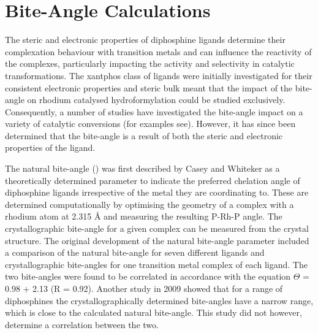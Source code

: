 
\section{Bite-Angle Calculations}
\label{section:biteangle}

The steric and electronic properties of diphosphine ligands determine their complexation behaviour with transition metals and can influence the reactivity of the complexes, particularly impacting the activity and selectivity in catalytic transformations.\cite{Freixa2003, Birkholz2009}  The xantphos class of ligands were initially investigated for their consistent electronic properties and steric bulk meant that the impact of the bite-angle on rhodium catalysed hydroformylation could be studied exclusively.\cite{Kranenburg1995}  Consequently, a number of studies have investigated the bite-angle impact on a variety of catalytic conversions (for examples see\cite{Kranenburg1995b, Haaren2001b, Dudle2011b, Fanjul2013, Birkholz2009}).  However, it has since been determined that the bite-angle is a result of both the steric and electronic properties of the ligand.\cite{Freixa2003}

The natural bite-angle (\natbiteangle) was first described by Casey and Whiteker\cite{Casey1990} as a theoretically determined parameter to indicate the preferred chelation angle of diphosphine ligands irrespective of the metal they are coordinating to.  These are determined computationally by optimising the geometry of a complex with a rhodium atom at 2.315 \si{\angstrom} and measuring the resulting P-Rh-P angle.  The crystallographic bite-angle for a given complex can be measured from the crystal structure.  The original development of the natural bite-angle parameter included a comparison of the natural bite-angle for seven different ligands and crystallographic bite-angles for one transition metal complex of each ligand.  The two bite-angles were found to be correlated in accordance with the equation $\Theta$ = 0.98\natbiteangle{} + 2.13 (R = 0.92).\cite{Casey1990}  Another study in 2009 showed that for a range of diphosphines the crystallographically determined bite-angles have a narrow range, which is close to the calculated natural bite-angle.\cite{Dierkes1999}  This study did not however, determine a correlation between the two.

